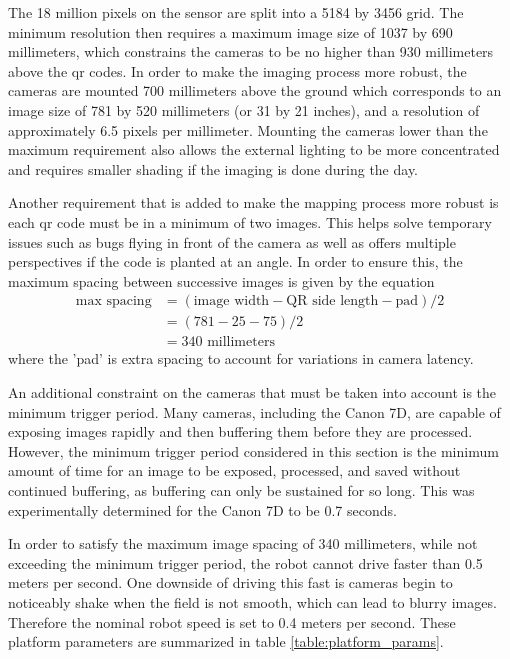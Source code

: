 The 18 million pixels on the sensor are split into a 5184 by 3456 grid.  The minimum resolution then requires a maximum image size of 1037 by 690 millimeters, which constrains the cameras to be no higher than 930 millimeters above the \ac{qr} codes.  In order to make the imaging process more robust, the cameras are mounted 700 millimeters above the ground which corresponds to an image size of 781 by 520 millimeters (or 31 by 21 inches), and a resolution of approximately 6.5 pixels per millimeter.  Mounting the cameras lower than the maximum requirement also allows the external lighting to be more concentrated and requires smaller shading if the imaging is done during the day.  

Another requirement that is added to make the mapping process more robust is each \ac{qr} code must be in a minimum of two images.  This helps solve temporary issues such as bugs flying in front of the camera as well as offers multiple perspectives if the code is planted at an angle.  In order to ensure this, the maximum spacing between successive images is given by the equation
\begin{align*}
 \text{max spacing} &= (\text{image width} - \text{QR side length} - \text{pad}) / 2 \\
             &= (781 - 25 - 75) / 2 \\ 
             &= 340 \text{ millimeters}
\end{align*}
where the 'pad' is extra spacing to account for variations in camera latency.
  
An additional constraint on the cameras that must be taken into account is the minimum trigger period.  Many cameras, including the Canon 7D, are capable of exposing images rapidly and then buffering them before they are processed.  However, the minimum trigger period considered in this section is the minimum amount of time for an image to be exposed, processed, and saved without continued buffering, as buffering can only be sustained for so long.  This was experimentally determined for the Canon 7D to be 0.7 seconds.  

In order to satisfy the maximum image spacing of 340 millimeters, while not exceeding the minimum trigger period, the robot cannot drive faster than 0.5 meters per second.  One downside of driving this fast is cameras begin to noticeably shake when the field is not smooth, which can lead to blurry images.  Therefore the nominal robot speed is set to 0.4 meters per second.  These platform parameters are summarized in table \ref{table:platform_params}.

